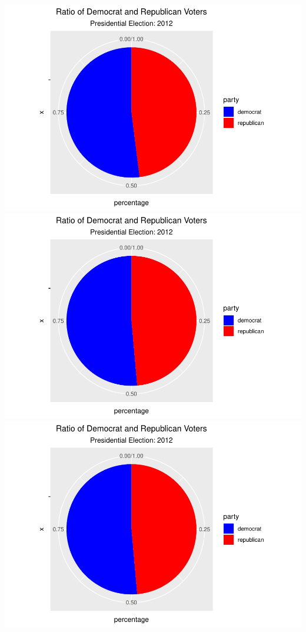 \documentclass[
]{article}
\begin{document}
\includegraphics{election_files/figure-latex/anim-82.pdf}
\includegraphics{election_files/figure-latex/anim-83.pdf}
\includegraphics{election_files/figure-latex/anim-84.pdf}
\end{document}
